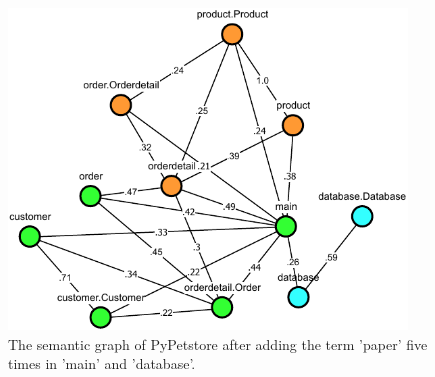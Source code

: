 \begin{figure}
    \caption{The semantic graph of PyPetstore after adding the term 'paper' five times in 'main' and 'database'.}
    \label{fig:pypetstore_semantic_graph_after_add_terms}
    \begin{adjustbox}{center}
    \includegraphics[width=300pt]{figures/data/pypetstore_semantic_add_depend.pdf}
    \end{adjustbox}
\end{figure}